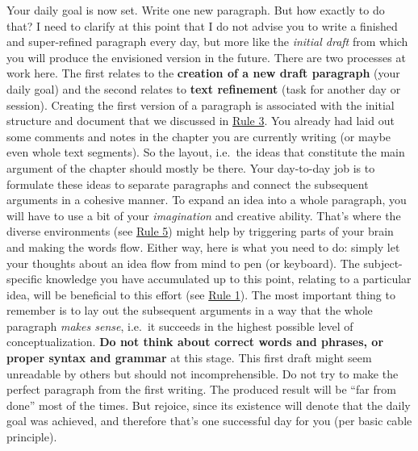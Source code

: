 \documentclass[
  12pt,
]{book}
\begin{document}
Your daily goal is now set.
Write one new paragraph.
But how exactly to do that?
I need to clarify at this point that I do not advise you to write a finished and super-refined paragraph every day, but more like the \emph{initial draft} from which you will produce the envisioned version in the future.
There are two processes at work here.
The first relates to the \textbf{creation of a new draft paragraph} (your daily goal) and the second relates to \textbf{text refinement} (task for another day or session).
Creating the first version of a paragraph is associated with the initial structure and document that we discussed in \protect\hyperlink{rule3}{Rule 3}.
You already had laid out some comments and notes in the chapter you are currently writing (or maybe even whole text segments).
So the layout, i.e.~the ideas that constitute the main argument of the chapter should mostly be there.
Your day-to-day job is to formulate these ideas to separate paragraphs and connect the subsequent arguments in a cohesive manner.
To expand an idea into a whole paragraph, you will have to use a bit of your \emph{imagination} and creative ability.
That's where the diverse environments (see \protect\hyperlink{rule5}{Rule 5}) might help by triggering parts of your brain and making the words flow.
Either way, here is what you need to do: simply let your thoughts about an idea flow from mind to pen (or keyboard).
The subject-specific knowledge you have accumulated up to this point, relating to a particular idea, will be beneficial to this effort (see \protect\hyperlink{rule1}{Rule 1}).
The most important thing to remember is to lay out the subsequent arguments in a way that the whole paragraph \emph{makes sense}, i.e.~it succeeds in the highest possible level of conceptualization.
\textbf{Do not think about correct words and phrases, or proper syntax and grammar} at this stage.
This first draft might seem unreadable by others but should not incomprehensible.
Do not try to make the perfect paragraph from the first writing.
The produced result will be ``far from done'' most of the times.
But rejoice, since its existence will denote that the daily goal was achieved, and therefore that's one successful day for you (per basic cable principle).
\end{document}
